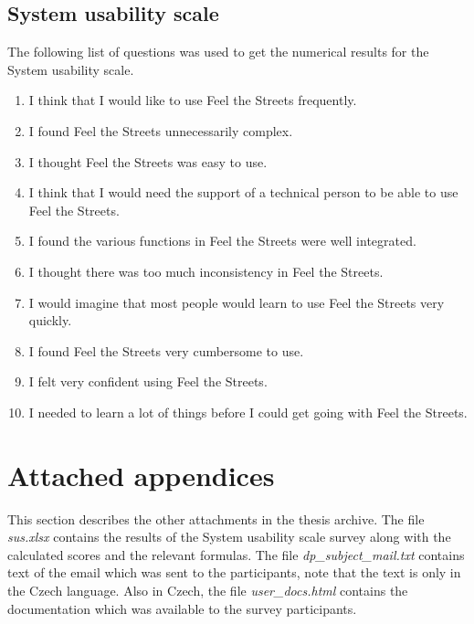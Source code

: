 \documentclass[nolof,digital]{fithesis3}
\begin{document}
\subsection{System usability scale}
The following list of questions was used to get the numerical results for the System usability scale.
\begin{enumerate}
\item I think that I would like to use Feel the Streets frequently.
\item I found Feel the Streets unnecessarily complex.
\item I thought Feel the Streets was easy to use.
\item I think that I would need the support of a technical person to be able to use Feel the Streets.
\item I found the various functions in Feel the Streets were well integrated.
\item I thought there was too much inconsistency in Feel the Streets.
\item I would imagine that most people would learn to use Feel the Streets very quickly.
\item I found Feel the Streets very cumbersome to use.
\item I felt very confident using Feel the Streets.
\item I needed to learn a lot of things before I could get going with Feel the Streets.
\end{enumerate}
\section{Attached appendices}
This section describes the other attachments in the thesis archive. The file \emph{sus.xlsx} contains the results of the System usability scale survey along with the calculated scores and the relevant formulas. The file \emph{dp\_subject\_mail.txt} contains text of the email which was sent to the participants, note that the text is only in the Czech language. Also in Czech, the file \emph{user\_docs.html} contains the documentation which was available to the survey participants.
\end{document}
